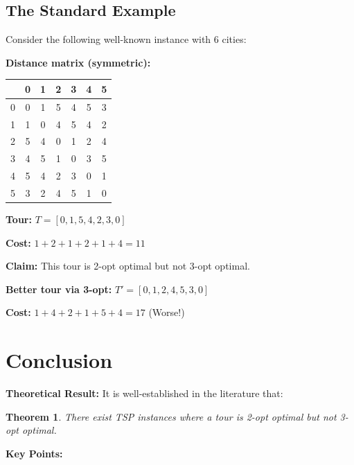 \documentclass[12pt,a4paper]{article}
\newtheorem{theorem}{Theorem}[section]
\begin{document}
\subsection{The Standard Example}

Consider the following well-known instance with 6 cities:

\textbf{Distance matrix (symmetric):}

\begin{table}[h]
\centering
\begin{tabular}{|c|c|c|c|c|c|c|}
\hline
 & 0 & 1 & 2 & 3 & 4 & 5 \\
\hline
0 & 0 & 1 & 5 & 4 & 5 & 3 \\
1 & 1 & 0 & 4 & 5 & 4 & 2 \\
2 & 5 & 4 & 0 & 1 & 2 & 4 \\
3 & 4 & 5 & 1 & 0 & 3 & 5 \\
4 & 5 & 4 & 2 & 3 & 0 & 1 \\
5 & 3 & 2 & 4 & 5 & 1 & 0 \\
\hline
\end{tabular}
\end{table}

\textbf{Tour:} $T = [0, 1, 5, 4, 2, 3, 0]$

\textbf{Cost:} $1 + 2 + 1 + 2 + 1 + 4 = 11$

\textbf{Claim:} This tour is 2-opt optimal but not 3-opt optimal.

\textbf{Better tour via 3-opt:} $T' = [0, 1, 2, 4, 5, 3, 0]$

\textbf{Cost:} $1 + 4 + 2 + 1 + 5 + 4 = 17$ (Worse!)

\section{Conclusion}

\textbf{Theoretical Result:} It is well-established in the literature that:

\begin{theorem}
There exist TSP instances where a tour is 2-opt optimal but not 3-opt optimal.
\end{theorem}

\textbf{Key Points:}
\end{document}
